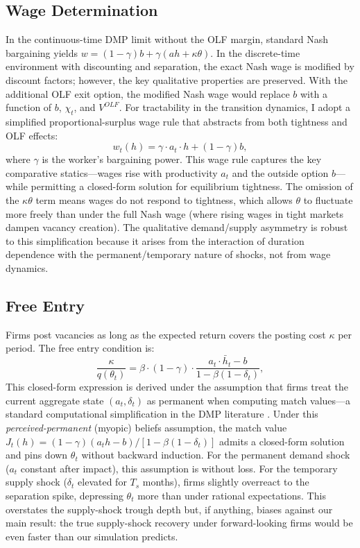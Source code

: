 \documentclass[12pt]{article}
\begin{document}
\subsection{Wage Determination}

In the continuous-time DMP limit without the OLF margin, standard Nash bargaining yields $w = (1 - \gamma)b + \gamma(ah + \kappa\theta)$. In the discrete-time environment with discounting and separation, the exact Nash wage is modified by discount factors; however, the key qualitative properties are preserved. With the additional OLF exit option, the modified Nash wage would replace $b$ with a function of $b$, $\chi_t$, and $V^{OLF}$. For tractability in the transition dynamics, I adopt a simplified proportional-surplus wage rule that abstracts from both tightness and OLF effects:
\begin{equation}
w_t(h) = \gamma \cdot a_t \cdot h + (1 - \gamma) b,
\label{eq:wage}
\end{equation}
where $\gamma$ is the worker's bargaining power. This wage rule captures the key comparative statics---wages rise with productivity $a_t$ and the outside option $b$---while permitting a closed-form solution for equilibrium tightness. The omission of the $\kappa\theta$ term means wages do not respond to tightness, which allows $\theta$ to fluctuate more freely than under the full Nash wage (where rising wages in tight markets dampen vacancy creation). The qualitative demand/supply asymmetry is robust to this simplification because it arises from the interaction of duration dependence with the permanent/temporary nature of shocks, not from wage dynamics.

\subsection{Free Entry}
\label{sec:free_entry}

Firms post vacancies as long as the expected return covers the posting cost $\kappa$ per period. The free entry condition is:
\begin{equation}
\frac{\kappa}{q(\theta_t)} = \beta \cdot (1 - \gamma) \cdot \frac{a_t \cdot \bar{h}_t - b}{1 - \beta(1 - \delta_t)},
\label{eq:freeentry}
\end{equation}
This closed-form expression is derived under the assumption that firms treat the current aggregate state $(a_t, \delta_t)$ as permanent when computing match values---a standard computational simplification in the DMP literature \citep{shimer2005cyclical,hall2005employment}. Under this \textit{perceived-permanent} (myopic) beliefs assumption, the match value $J_t(h) = (1-\gamma)(a_t h - b) / [1-\beta(1-\delta_t)]$ admits a closed-form solution and pins down $\theta_t$ without backward induction. For the permanent demand shock ($a_t$ constant after impact), this assumption is without loss. For the temporary supply shock ($\delta_t$ elevated for $T_s$ months), firms slightly overreact to the separation spike, depressing $\theta_t$ more than under rational expectations. This overstates the supply-shock trough depth but, if anything, biases against our main result: the true supply-shock recovery under forward-looking firms would be even faster than our simulation predicts.
\end{document}
